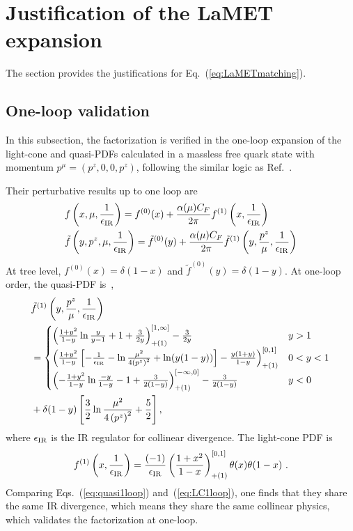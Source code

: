 \documentclass[a4paper,11pt]{article}
\begin{document}
\appendix

\iffalse
\section{Justification of the LaMET expansion}\label{sec:justLaMET}
The section provides the justifications for Eq.~(\ref{eq:LaMETmatching}).

\subsection{One-loop validation}\label{sec:justLaMET1}
In this subsection, the factorization is verified in the one-loop expansion of the light-cone and quasi-PDFs calculated in a massless free quark state with momentum $p^{\mu}=(p^z,0,0,p^z)$, following the similar logic as Ref.~\cite{Ji:2020ect}. 

Their perturbative results up to one loop are
\begin{align}\label{eq:perp1loop}
    &f\left(x,\mu,\frac{1}{\epsilon_{\rm IR}}\right) = f^{(0)}(x) + \frac{\alpha(\mu) C_F}{2 \pi} f^{(1)}\left(x,\frac{1}{\epsilon_{\rm IR}}\right) \nonumber\\
    &\tilde f\left(y,p^z,\mu,\frac{1}{\epsilon_{\rm IR}}\right) = \tilde f^{(0)}(y) + \frac{\alpha(\mu) C_F}{2 \pi} \tilde f^{(1)}\left(y,\frac{p^z}{\mu},\frac{1}{\epsilon_{\rm IR}}\right)
\end{align}
At tree level, $f^{(0)}(x) = \delta(1-x)$ and $\tilde f^{(0)}(y) = \delta(1-y)$. At one-loop order, the quasi-PDF is~\cite{Izubuchi:2018srq},
\begin{equation}\label{eq:quasi1loop}
\begin{aligned}
& \tilde f^{(1)}\left(y,\frac{p^z}{\mu},\frac{1}{\epsilon_{\rm IR}}\right) \\
&= \begin{cases}\left(\frac{1+y^2}{1-y} \ln \frac{y}{y-1}+1+\frac{3}{2 y}\right)^{[1, \infty]}_{+(1)}-\frac{3}{2 y} & y>1 \\
\left(\frac{1+y^2}{1-y}\left[-\frac{1}{\epsilon_{\mathrm{IR}}}-\ln \frac{\mu^2}{4\left(p^z\right)^2}+\ln (y(1-y))\right]-\frac{y(1+y)}{1-y}\right)^{[0,1]}_{+(1)} & 0<y<1 \\
\left(-\frac{1+y^2}{1-y} \ln \frac{-y}{1-y}-1+\frac{3}{2(1-y)}\right)_{+(1)}^{[-\infty, 0]} -\frac{3}{2(1-y)} & y<0\end{cases} \\
& +\delta(1-y)\left[\frac{3}{2} \ln \frac{\mu^2}{4\left(p^z\right)^2}+\frac{5}{2}\right], 
\end{aligned}
\end{equation}
where $\epsilon_{\rm IR}$ is the IR regulator for collinear divergence. The light-cone PDF is
\begin{align}\label{eq:LC1loop}
    f^{(1)}\left(x, \frac{1}{\epsilon_{\rm IR}}\right)=\frac{(-1)}{\epsilon_{\mathrm{IR}}}\left(\frac{1+x^2}{1-x}\right)_{+(1)}^{[0,1]} \theta(x) \theta(1-x) \ .
\end{align}
Comparing Eqs.~(\ref{eq:quasi1loop}) and~(\ref{eq:LC1loop}), one finds that they share the same IR divergence, which means they share the same collinear physics, which validates the factorization at one-loop. 
\end{document}
